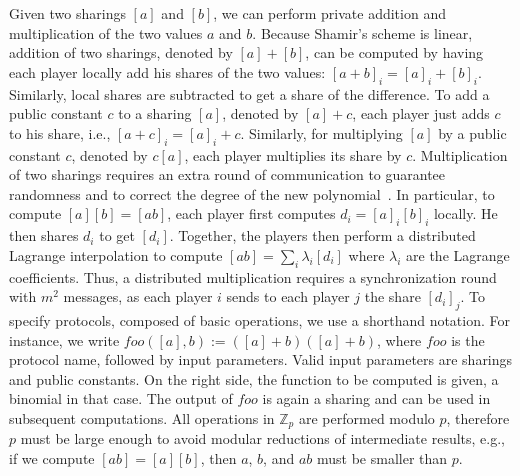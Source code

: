 \documentclass[letterpaper,11pt,onecolumn,titlepage]{article}
\begin{document}
Given two sharings $[a]$ and $[b]$, we can perform private addition and multiplication of the two values $a$ and $b$. 
Because Shamir's scheme is linear, addition of two sharings, denoted by $[a]+[b]$, can be computed by having 
each player locally add his shares of the two values: $[a+b]_i=[a]_i+[b]_i$.
Similarly, local shares are subtracted to get a share of the difference.
To add a public constant $c$ to a sharing $[a]$, denoted by $[a]+c$, each player just adds $c$ to his share, i.e.,
$[a+c]_i = [a]_i+c$. Similarly, for multiplying $[a]$ by a public constant $c$, denoted by $c[a]$, each player multiplies its share by $c$.
Multiplication of two sharings requires an extra round of communication to guarantee randomness and to correct the degree of the
new polynomial~\cite{benor1988ctn,gennaro1998sva}. In particular, to compute $[a][b]=[ab]$, each player first computes $d_i=[a]_i[b]_i$ locally. He
then shares $d_i$ to get $[d_i]$. Together, the players then perform a distributed Lagrange interpolation to compute $[ab] = \sum_i{\lambda_i[d_i]}$ where $\lambda_i$ are the Lagrange coefficients. Thus, a distributed multiplication requires a synchronization round with $m^2$ messages, as each player $i$ sends to each player $j$ the share $[d_i]_j$. 
To specify protocols, composed of basic operations, we use a shorthand notation. For instance, 
we write $foo([a],b):=([a]+b)([a]+b)$, where $foo$ is the protocol name, followed by input parameters. Valid input parameters are sharings and public
constants. On the right side, the function to be computed is given, a binomial in that case. The output of $foo$ is again a sharing and can be used in 
subsequent computations.
All operations in $\mathbb{Z}_p$ are performed modulo $p$,
therefore $p$ must be large enough to avoid modular reductions of
intermediate results, e.g., if we compute $[ab]=[a][b]$, then $a$, $b$, and $ab$ must be smaller than $p$. 
\end{document}
